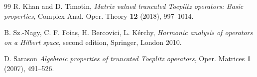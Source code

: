 \documentclass[11pt]{amsart}
\numberwithin{equation}{section}
\theoremstyle{definition}
\numberwithin{equation}{section}
\begin{document}
\begin{thebibliography}{99}
{R. Khan and D. Timotin}, \textit{Matrix valued trancated Toeplitz operators: Basic properties},
Complex Anal. Oper. Theory {\bf 12} (2018), 997--1014.
%


{B. Sz.-Nagy, C. F. Foias, H. Bercovici, L. K\'{e}rchy},
\textit{Harmonic analysis of operators on a Hilbert space}, second edition,  Springer, London 2010.


{D. Sarason}
\textit{Algebraic properties of truncated Toeplitz operators}, Oper. Matrices {\bf 1} (2007), 491--526.



\end{thebibliography}
\end{document}
